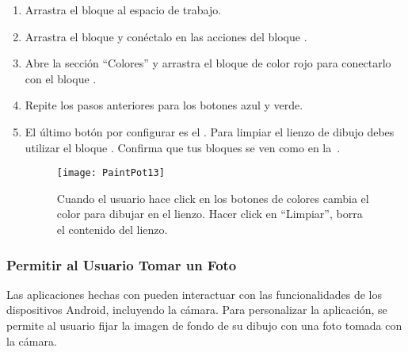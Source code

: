 \begin{enumerate}
\item Arrastra el bloque  al espacio de
  trabajo.

\item Arrastra el bloque  y
  conéctalo en las acciones del bloque .

\item Abre la sección ``Colores'' y arrastra el bloque de color rojo
  para conectarlo con el bloque .

\item Repite los pasos anteriores para los botones azul y verde.

\item El último botón por configurar es el
  . Para limpiar el lienzo de dibujo debes
  utilizar el bloque . Confirma que tus
  bloques se ven como en la~.

\begin{figure}[H]
\centering
\texttt{[image: PaintPot13]}
\caption{Cuando el usuario hace click en los botones de colores cambia
el color para dibujar en el lienzo. Hacer click en ``Limpiar'', borra
el contenido del lienzo.}
\label{fig:PaintPot13}
\end{figure}

\end{enumerate}

\subsubsection*{Permitir al Usuario Tomar un Foto}

Las aplicaciones hechas con \AppInventor pueden interactuar con las
funcionalidades de los dispositivos Android, incluyendo la
cámara. Para personalizar la aplicación, se permite al usuario fijar
la imagen de fondo de su dibujo con una foto tomada con la cámara.


